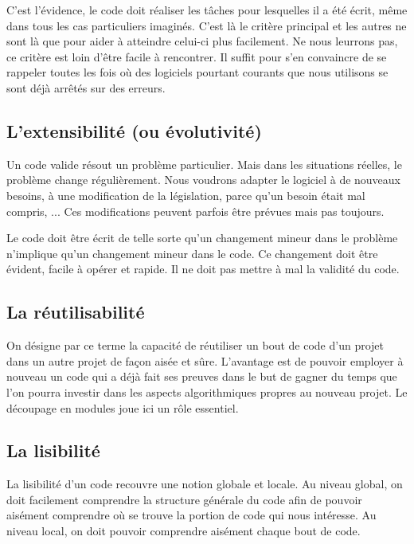 	{
	C'est l'évidence, le code doit
	réaliser les tâches pour lesquelles il a été écrit, même dans tous les
	cas particuliers imaginés. C'est là le critère
	principal et les autres ne sont là que pour aider à atteindre celui-ci
	plus facilement. Ne nous leurrons pas, ce critère est loin
	d'être facile à rencontrer. Il suffit pour
	s'en convaincre de se rappeler toutes les fois où des
	logiciels pourtant courants que nous utilisons se sont déjà arrêtés sur
	des erreurs.}

\subsection{L'extensibilité (ou évolutivité)}

	{
	Un code valide résout un problème particulier. Mais dans les situations
	réelles, le problème change régulièrement. Nous voudrons adapter le
	logiciel à de nouveaux besoins, à une modification de la législation,
	parce qu’un besoin était mal compris, ... Ces modifications peuvent
	parfois être prévues mais pas toujours.}

	{
	Le code doit être écrit de telle sorte qu'un changement
	mineur dans le problème n'implique
	qu'un changement mineur dans le code. Ce changement
	doit être évident, facile à opérer et rapide. Il ne doit pas mettre à
	mal la validité du code.}

\subsection{La réutilisabilité}

	{On désigne par ce terme la capacité de réutiliser 
	un bout de code d’un projet dans un autre projet de 
	façon aisée et sûre. L’avantage est de pouvoir employer 
	à nouveau un code qui a déjà fait ses preuves dans le 
	but de gagner du temps que l’on pourra investir dans les 
	aspects algorithmiques propres au nouveau projet. 
	Le découpage en modules joue ici un rôle essentiel.
}

\subsection{La lisibilité}

	{
	La lisibilité d'un code recouvre une notion globale et
	locale. Au niveau global, on doit facilement comprendre la structure
	générale du code afin de pouvoir aisément comprendre où se trouve 
	la portion de	code qui nous intéresse. 
	Au niveau local, on doit pouvoir comprendre
	aisément chaque bout de code.}

